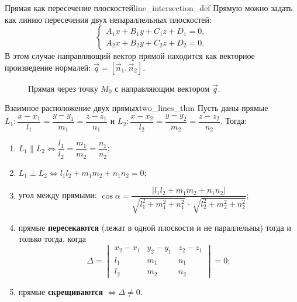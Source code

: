 \documentclass[12pt,a4paper]{article}
\begin{document}
\begin{definition}{Прямая как пересечение плоскостей}{line_intersection_def}
  Прямую можно задать как линию пересечения двух непараллельных
  плоскостей:
  \begin{equation}
    \begin{cases}
      A_1x + B_1y + C_1z + D_1 = 0, \\
      A_2x + B_2y + C_2z + D_2 = 0.
    \end{cases}
    \tag{10.11}\label{eq:line_planes}
  \end{equation}
  В этом случае направляющий вектор прямой находится как векторное
  произведение нормалей: $\vec{q} = [\vec{n}_1, \vec{n}_2]$.
\end{definition}

\begin{figure}[h!]
  \centering
  \caption{Прямая через точку $M_0$ с направляющим вектором $\vec{q}$.}
  \label{fig:line}
\end{figure}

\begin{theorem}{Взаимное расположение двух прямых}{two_lines_thm}
  Пусть даны прямые
  $L_1\colon \dfrac{x-x_1}{l_1} = \dfrac{y-y_1}{m_1} = \dfrac{z-z_1}{n_1}$
  и
  $L_2\colon \dfrac{x-x_2}{l_2} = \dfrac{y-y_2}{m_2} = \dfrac{z-z_2}{n_2}$.
  Тогда:
  \begin{enumerate}
    \item $L_1 \parallel L_2 \iff
      \dfrac{l_1}{l_2} = \dfrac{m_1}{m_2} = \dfrac{n_1}{n_2}$;
    \item $L_1 \perp L_2 \iff l_1l_2 + m_1m_2 + n_1n_2 = 0$;
    \item угол между прямыми:
      $\cos\alpha = \dfrac{|l_1l_2 + m_1m_2 + n_1n_2|}
      {\sqrt{l_1^2+m_1^2+n_1^2}\,\cdot\,\sqrt{l_2^2+m_2^2+n_2^2}}$;
    \item прямые \textbf{пересекаются} (лежат в одной плоскости и не
      параллельны) тогда и только тогда, когда
      \[
        \Delta =
        \begin{vmatrix}
          x_2 - x_1 & y_2 - y_1 & z_2 - z_1 \\
          l_1 & m_1 & n_1 \\
          l_2 & m_2 & n_2
        \end{vmatrix} = 0;
      \]
    \item прямые \textbf{скрещиваются} $\iff \Delta \neq 0$.
  \end{enumerate}
\end{theorem}
\end{document}
